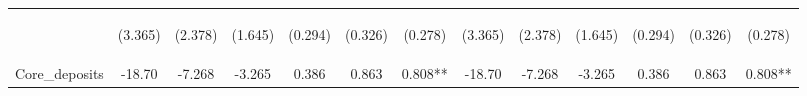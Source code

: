 \documentclass[]{article}
\begin{document}
\begin{center}
\begin{tabular}{lcccccccccccc}
\vspace{4pt} & \begin{footnotesize}(3.365)\end{footnotesize} & \begin{footnotesize}(2.378)\end{footnotesize} & \begin{footnotesize}(1.645)\end{footnotesize} & \begin{footnotesize}(0.294)\end{footnotesize} & \begin{footnotesize}(0.326)\end{footnotesize} & \begin{footnotesize}(0.278)\end{footnotesize} & \begin{footnotesize}(3.365)\end{footnotesize} & \begin{footnotesize}(2.378)\end{footnotesize} & \begin{footnotesize}(1.645)\end{footnotesize} & \begin{footnotesize}(0.294)\end{footnotesize} & \begin{footnotesize}(0.326)\end{footnotesize} & \begin{footnotesize}(0.278)\end{footnotesize} \\
Core\_deposits & -18.70 & -7.268 & -3.265 & 0.386 & 0.863 & 0.808** & -18.70 & -7.268 & -3.265 & 0.386 & 0.863 & 0.808** \\

\end{tabular}
\end{center}
\end{document}
